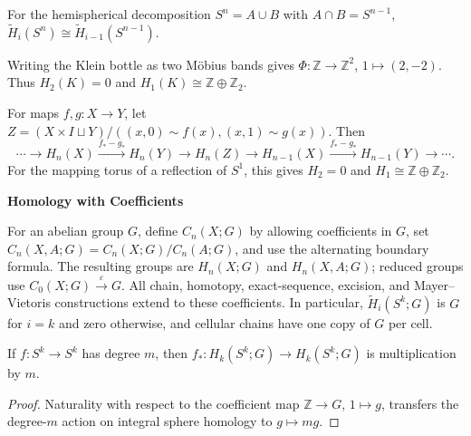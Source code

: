 \begin{example}
\label{ex:mayer-vietoris-sphere}
For the hemispherical decomposition $S^n=A\cup B$ with $A\cap B=S^{n-1}$, $\widetilde H_i(S^n)\cong\widetilde H_{i-1}(S^{n-1})$.
\end{example}

\begin{example}
\label{ex:mayer-vietoris-klein-bottle}
Writing the Klein bottle as two Möbius bands gives $\Phi:\mathbb{Z}\to\mathbb{Z}^2$, $1\mapsto(2,-2)$.  Thus $H_2(K)=0$ and $H_1(K)\cong\mathbb{Z}\oplus\mathbb{Z}_2$.
\end{example}

\begin{example}
\label{ex:homology-mapping-torus}
For maps $f,g:X\to Y$, let $Z=(X\times I\sqcup Y)/((x,0)\sim f(x),(x,1)\sim g(x))$.  Then
\[
\cdots\to H_n(X)\xrightarrow{f_*-g_*}H_n(Y)\to H_n(Z)\to H_{n-1}(X)\xrightarrow{f_*-g_*}H_{n-1}(Y)\to\cdots.
\]
For the mapping torus of a reflection of $S^1$, this gives $H_2=0$ and $H_1\cong\mathbb{Z}\oplus\mathbb{Z}_2$.
\end{example}

\textbf{Homology with Coefficients}

For an abelian group $G$, define $C_n(X;G)$ by allowing coefficients in $G$, set $C_n(X,A;G)=C_n(X;G)/C_n(A;G)$, and use the alternating boundary formula.  The resulting groups are $H_n(X;G)$ and $H_n(X,A;G)$; reduced groups use $C_0(X;G)\xrightarrow{\varepsilon}G$.  All chain, homotopy, exact-sequence, excision, and Mayer--Vietoris constructions extend to these coefficients.  In particular, $\widetilde H_i(S^k;G)$ is $G$ for $i=k$ and zero otherwise, and cellular chains have one copy of $G$ per cell.

\begin{lemma}
\label{lem:homology-map-degree-m-coefficients}
If $f:S^k\to S^k$ has degree $m$, then $f_*:H_k(S^k;G)\to H_k(S^k;G)$ is multiplication by $m$.
\end{lemma}
\begin{proof}
\sketch Naturality with respect to the coefficient map $\mathbb{Z}\to G$, $1\mapsto g$, transfers the degree-$m$ action on integral sphere homology to $g\mapsto mg$.
\end{proof}

